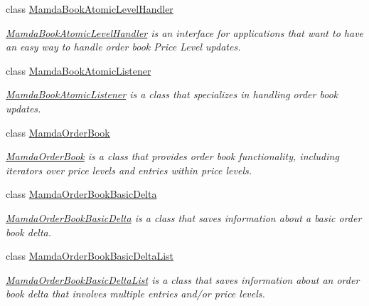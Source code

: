 \begin{CompactItemize}
class \hyperlink{classWombat_1_1MamdaBookAtomicLevelHandler}{Mamda\-Book\-Atomic\-Level\-Handler}
\begin{CompactList}\small\item\em \hyperlink{classWombat_1_1MamdaBookAtomicLevelHandler}{Mamda\-Book\-Atomic\-Level\-Handler} is an interface for applications that want to have an easy way to handle order book Price Level updates. \item\end{CompactList}\item 
class \hyperlink{classWombat_1_1MamdaBookAtomicListener}{Mamda\-Book\-Atomic\-Listener}
\begin{CompactList}\small\item\em \hyperlink{classWombat_1_1MamdaBookAtomicListener}{Mamda\-Book\-Atomic\-Listener} is a class that specializes in handling order book updates. \item\end{CompactList}\item 
class \hyperlink{classWombat_1_1MamdaOrderBook}{Mamda\-Order\-Book}
\begin{CompactList}\small\item\em \hyperlink{classWombat_1_1MamdaOrderBook}{Mamda\-Order\-Book} is a class that provides order book functionality, including iterators over price levels and entries within price levels. \item\end{CompactList}\item 
class \hyperlink{classWombat_1_1MamdaOrderBookBasicDelta}{Mamda\-Order\-Book\-Basic\-Delta}
\begin{CompactList}\small\item\em \hyperlink{classWombat_1_1MamdaOrderBookBasicDelta}{Mamda\-Order\-Book\-Basic\-Delta} is a class that saves information about a basic order book delta. \item\end{CompactList}\item 
class \hyperlink{classWombat_1_1MamdaOrderBookBasicDeltaList}{Mamda\-Order\-Book\-Basic\-Delta\-List}
\begin{CompactList}\small\item\em \hyperlink{classWombat_1_1MamdaOrderBookBasicDeltaList}{Mamda\-Order\-Book\-Basic\-Delta\-List} is a class that saves information about an order book delta that involves multiple entries and/or price levels. \item\end{CompactList}\item 

\end{CompactItemize}
